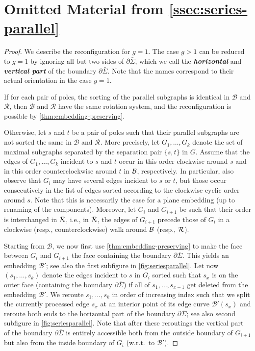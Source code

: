 \documentclass[a4paper,USenglish,cleveref,colorlinks=true,urlcolor=black,linkcolor=black,citecolor=black,thm-restate,authorcolumns]{lipics-v2021}
\theoremstyle{claimstyle}
\def\defn#1{\textit{\textbf{\boldmath #1}}}
\renewcommand{\emph}[1]{\defn{#1}}
\begin{document}

\section{Omitted Material from \cref{ssec:series-parallel}}
\label{app:series-parallel}

\thmseriesparallel*

\begin{proof}
    \label{Pseriesparallel}
    We describe the reconfiguration for $g=1$.
    The case $g>1$ can be reduced to $g=1$ by ignoring all but two sides of $\partial\bar\Sigma$, which we call the \emph{horizontal} and \emph{vertical part} of the boundary $\partial\bar\Sigma$.
    Note that the names correspond to their actual orientation in the case $g=1$.

    If for each pair of poles, the sorting of the parallel subgraphs is identical in $\mathcal{B}$ and $\mathcal{R}$, then $\mathcal{B}$ and $\mathcal{R}$ have the same rotation system,
    and the reconfiguration is possible by \cref{thm:embedding-preserving}.


    Otherwise, let $s$ and $t$ be a pair of poles such that their parallel subgraphs are not sorted the same in $\mathcal{B}$ and $\mathcal{R}$.
    More precisely, let $G_1,\ldots, G_k$ denote the set of maximal subgraphs separated by the separation pair $\{s,t\}$ in $G$.
    Assume that the edges of $G_1,\ldots, G_k$ incident to $s$ and $t$ occur in this order clockwise around $s$ and in this order counterclockwise around $t$ in $\cal B$, respectively.
    In particular, also observe that $G_i$ may have several edges incident to $s$ or $t$, but those occur consecutively in the list of edges sorted according to the clockwise cyclic order around $s$.
    Note that this is necessarily the case for a plane embedding (up to renaming of the components).
    Moreover, let $G_i$ and $G_{i+1}$ be such that their order is interchanged in $\cal R$, i.e., in $\cal R$, the edges of $G_{i+1}$ precede those of $G_i$ in a clockwise (resp., counterclockwise) walk around $\cal B$ (resp., $\cal R$).

    Starting from $\mathcal{B}$, we now first use \cref{thm:embedding-preserving} to make the face between $G_i$ and $G_{i+1}$ the face containing the boundary $\partial\bar{\Sigma}$.
    This yields an embedding $\mathcal{B}'$; see also the first subfigure in \cref{fig:seriesparallel}.
    Let now $(s_1,\ldots,s_k)$ denote the edges incident to $s$ in $G_{i}$ sorted such that $s_x$ is on the outer face (containing the boundary $\partial\bar{\Sigma}$) if all of $s_1,\ldots,s_{x-1}$ get deleted from the embedding $\mathcal{B}'$.
    We reroute $s_1,\ldots,s_k$ in order of increasing index such that we split the currently processed edge $s_x$ at an interior point of its edge curve $\mathcal{B}'(s_x)$ and reroute both ends to the horizontal part of the boundary $\partial\bar\Sigma$; see also second subfigure in \cref{fig:seriesparallel}.
    Note that after these reroutings the vertical part of the boundary $\partial\bar{\Sigma}$ is entirely accessible both from the outside boundary of $G_{i+1}$ but also from the inside boundary of $G_i$ (w.r.t.\ to $\mathcal{B}'$).


\end{proof}
\end{document}
